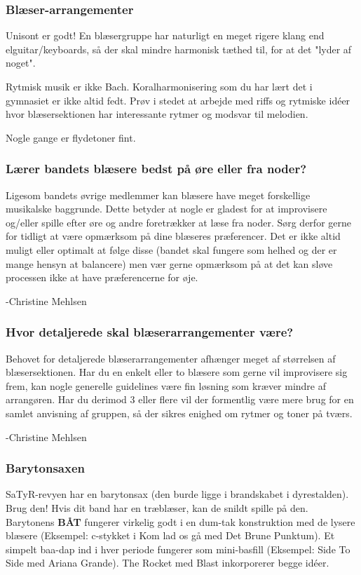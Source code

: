 \subsubsection{Blæser-arrangementer}
Unisont er godt! En blæsergruppe har naturligt en meget rigere klang end elguitar/keyboards, så der skal mindre harmonisk tæthed til, for at det "lyder af noget".

Rytmisk musik er ikke Bach. Koralharmonisering som du har lært det i gymnasiet er ikke altid fedt. Prøv i stedet at arbejde med riffs og rytmiske idéer hvor blæsersektionen har interessante rytmer og modsvar til melodien.

Nogle gange er flydetoner fint.

\subsubsection{Lærer bandets blæsere bedst på øre eller fra noder?}
Ligesom bandets øvrige medlemmer kan blæsere have meget forskellige musikalske baggrunde. Dette betyder at nogle er gladest for at improvisere og/eller spille efter øre og andre foretrækker at læse fra noder. Sørg derfor gerne for tidligt at være opmærksom på dine blæseres præferencer. Det er ikke altid muligt eller optimalt at følge disse (bandet skal fungere som helhed og der er mange hensyn at balancere) men vær gerne opmærksom på at det kan sløve processen ikke at have præferencerne for øje.

-Christine Mehlsen

\subsubsection{Hvor detaljerede skal blæserarrangementer være?}
Behovet for detaljerede blæserarrangementer afhænger meget af størrelsen af blæsersektionen. Har du en enkelt eller to blæsere som gerne vil improvisere sig frem, kan nogle generelle guidelines være fin løsning som kræver mindre af arrangøren. Har du derimod 3 eller flere vil der formentlig være mere brug for en samlet anvisning af gruppen, så der sikres enighed om rytmer og toner på tværs. 

-Christine Mehlsen

\subsubsection{Barytonsaxen}
SaTyR-revyen har en barytonsax (den burde ligge i brandskabet i dyrestalden). Brug den! Hvis dit band har en træblæser, kan de snildt spille på den. Barytonens \textbf{BÅT} fungerer virkelig godt i en dum-tak konstruktion med de lysere blæsere (Eksempel: c-stykket i Kom lad os gå med Det Brune Punktum). Et simpelt baa-dap ind i hver periode fungerer som mini-basfill (Eksempel: Side To Side med Ariana Grande). The Rocket med Blast inkorporerer begge idéer.

